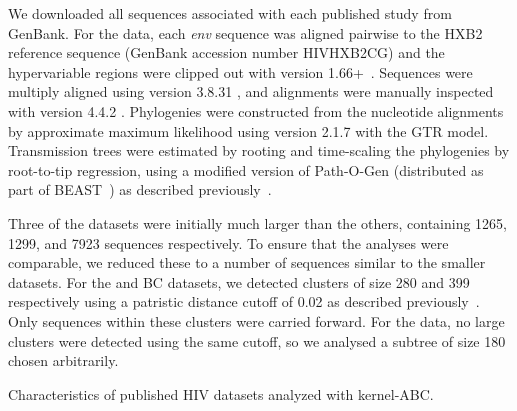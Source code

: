 We downloaded all sequences associated with each published study from GenBank.
For the \textcite{novitsky2014impact} data, each \textit{env} sequence was
aligned pairwise to the HXB2 reference sequence (GenBank accession number
HIVHXB2CG) and the hypervariable regions were clipped out with
 version 1.66+~\autocite{cock2009biopython}. Sequences were
multiply aligned using  version 3.8.31
\autocite{edgar2004muscle}, and alignments were manually inspected with
 version 4.4.2 \autocite{gouy2010seaview}. Phylogenies were
constructed from the nucleotide alignments by approximate maximum likelihood
using  version 2.1.7 with the \gls{GTR} model. Transmission
trees were estimated by rooting and time-scaling the phylogenies by root-to-tip
regression, using a modified version of Path-O-Gen (distributed as part of
BEAST~\autocite{drummond2007beast}) as described
previously~\autocite{poon2015phylodynamic}. 

Three of the datasets \autocite[][and the BC data]{li2015hiv,novitsky2014impact}
were initially much larger than the others, containing 1265, 1299, and 7923
sequences respectively. To ensure that the analyses were comparable, we reduced
these to a number of sequences similar to the smaller datasets. For the
\citeauthor{li2015hiv} and BC datasets, we detected clusters of size 280 and
399 respectively using a patristic distance cutoff of 0.02 as described
previously~\autocite{poon2015impact}. Only sequences within these clusters were
carried forward. For the \textcite{novitsky2014impact} data, no large clusters
were detected using the same cutoff, so we analysed a subtree of size 180
chosen arbitrarily.

\begin{table}[ht]
  \centering
  
  \caption{Characteristics of published HIV datasets analyzed with kernel-ABC.}
  \label{tab:realdata}
\end{table}
